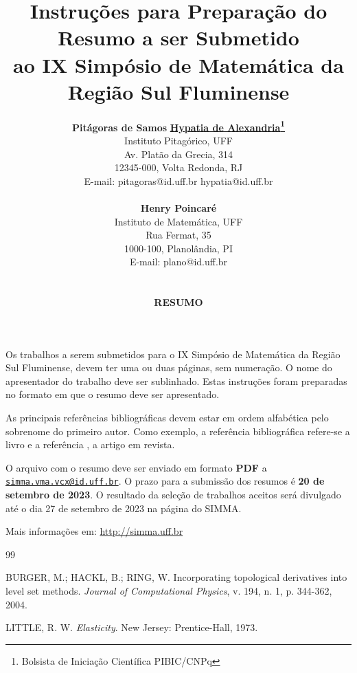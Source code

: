 \documentclass[a4paper,10pt]{article}
\begin{document}
\title{\vspace{-1cm} 
\Large{\bf Instruções para Preparação do Resumo a ser Submetido\\ 
ao IX Simpósio de Matemática da Região Sul Fluminense}
}

\author{ 
{\bf {\large Pitágoras de Samos}} \hspace*{1cm} 
{\bf {\large \underline{Hypatia de Alexandria}\footnote{Bolsista de Iniciação Científica PIBIC/CNPq}}}  \\[4pt]
{\small Instituto Pitagórico, UFF} \\
{\small Av. Platão da Grecia, 314} \\
{\small 12345-000, Volta Redonda, RJ} \\
{\small E-mail: pitagoras@id.uff.br \hspace*{1cm}  hypatia@id.uff.br} 
\\
\\
{\bf {\large Henry Poincaré}}  \\[4pt]
{\small Instituto de Matemática, UFF} \\
{\small Rua Fermat, 35} \\
{\small 1000-100, Planolândia, PI} \\
{\small E-mail: plano@id.uff.br}
 \\
 \\
 \\
\textbf{RESUMO}
}

\date{}
\maketitle
\thispagestyle{fancy}


Os trabalhos a serem submetidos para o IX Simpósio de Matemática da Região Sul Fluminense, devem ter uma ou duas páginas, sem numeração. O nome do apresentador do trabalho deve ser sublinhado. Estas instruções foram preparadas no formato em que o resumo deve ser apresentado. 

As principais referências bibliográficas devem estar em ordem alfabética pelo sobrenome do primeiro autor. Como exemplo, a referência bibliográfica \cite{hig} refere-se a livro e a referência
\cite{key1}, a artigo em revista.

O arquivo com o resumo deve ser enviado em formato \textbf{PDF} a \href{mailto:simma.vma.vcx@id.uff.br}{\tt\color{blue}simma.vma.vcx@id.uff.br}.  O prazo para a submissão dos resumos é \textbf{\color{red} 20 de setembro de 2023}. O resultado da seleção de trabalhos aceitos será divulgado até o dia 27 de setembro de 2023 na página do SIMMA.

Mais informações em: {\color{blue}\url{http://simma.uff.br}}

\begin{thebibliography}{99}

 BURGER, M.; HACKL, B.; RING, W. Incorporating topological derivatives
into level set methods. \emph{Journal of Computational Physics}, v. 194, n. 1, p. 344-362,
2004.

  LITTLE, R. W. \emph{Elasticity}. New Jersey: Prentice-Hall, 1973.
\end{thebibliography}
\end{document}
